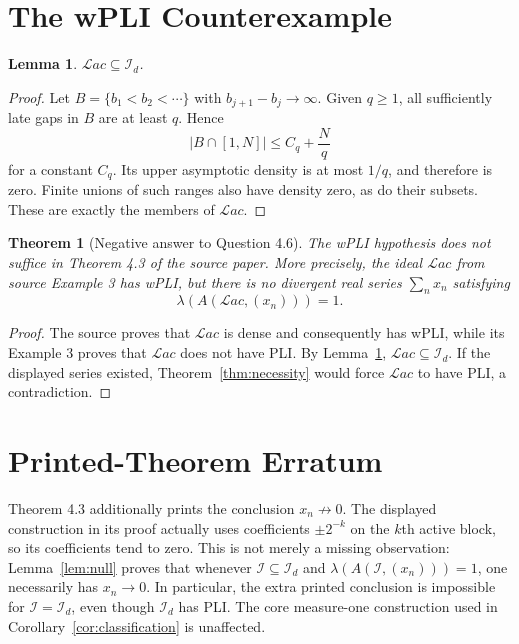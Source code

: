 \documentclass[11pt]{article}
\newtheorem{theorem}{Theorem}
\newtheorem{lemma}{Lemma}
\newcommand{\cI}{\mathcal I}
\newcommand{\Lac}{\mathcal{L}ac}
\newcommand{\Id}{\mathcal I_d}
\begin{document}
\section*{The wPLI Counterexample}

\begin{lemma}
\label{lem:lac-density}
$\Lac\subseteq\Id$.
\end{lemma}

\begin{proof}
Let $B=\{b_1<b_2<\cdots\}$ with $b_{j+1}-b_j\to\infty$.  Given $q\geq1$,
all sufficiently late gaps in $B$ are at least $q$.  Hence
\[
 |B\cap[1,N]|\leq C_q+\frac{N}{q}
\]
for a constant $C_q$.  Its upper asymptotic density is at most $1/q$, and
therefore is zero.  Finite unions of such ranges also have density zero, as
do their subsets.  These are exactly the members of $\Lac$.
\end{proof}

\begin{theorem}[Negative answer to Question 4.6]
\label{thm:counterexample}
The wPLI hypothesis does not suffice in Theorem 4.3 of the source paper.  More
precisely, the ideal $\Lac$ from source Example 3 has wPLI, but there is no
divergent real series $\sum_nx_n$ satisfying
\[
 \lambda(A(\Lac,(x_n)))=1.
\]
\end{theorem}

\begin{proof}
The source proves that $\Lac$ is dense and consequently has wPLI, while its
Example 3 proves that $\Lac$ does not have PLI.  By
Lemma~\ref{lem:lac-density}, $\Lac\subseteq\Id$.  If the displayed series
existed, Theorem~\ref{thm:necessity} would force $\Lac$ to have PLI, a
contradiction.
\end{proof}

\section*{Printed-Theorem Erratum}

Theorem 4.3 additionally prints the conclusion $x_n\not\to0$.  The displayed
construction in its proof actually uses coefficients $\pm2^{-k}$ on the
$k$th active block, so its coefficients tend to zero.  This is not merely a
missing observation: Lemma~\ref{lem:null} proves that whenever
$\cI\subseteq\Id$ and $\lambda(A(\cI,(x_n)))=1$, one necessarily has
$x_n\to0$.  In particular, the extra printed conclusion is impossible for
$\cI=\Id$, even though $\Id$ has PLI.  The core measure-one construction used
in Corollary~\ref{cor:classification} is unaffected.
\end{document}
